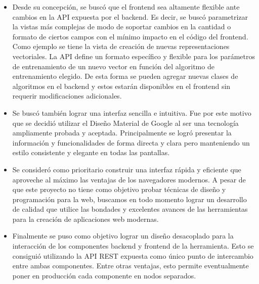 \begin{itemize}

\item Desde su concepción, se buscó que el frontend sea altamente flexible ante cambios en la API expuesta
por el backend. Es decir, se buscó parametrizar la vistas más complejas de modo de soportar cambios en la
cantidad o formato de ciertos campos con el mínimo impacto en el código del frontend. Como ejemplo se tiene
la vista de creación de nuevas representaciones vectoriales. La API define un formato específico y flexible
para los parámetros de entrenamiento de un nuevo vector en función del algoritmo de entrenamiento elegido.
De esta forma se pueden agregar nuevas clases de algoritmos en el backend y estos estarán disponibles en el
frontend sin requerir modificaciones adicionales.

\item Se buscó también lograr una interfaz sencilla e intuitiva. Fue por este motivo que se decidió
utilizar el Diseño Material de Google al ser una tecnología ampliamente probada y aceptada. Principalmente
se logró presentar la información y funcionalidades de forma directa y clara pero manteniendo un estilo
consistente y elegante en todas las pantallas.

\item Se consideró como prioritario construir una interfaz rápida y eficiente que aproveche al máximo las
ventajas de los navegadores modernos. A pesar de que este proyecto no tiene como objetivo probar técnicas
de diseño y programación para la web, buscamos en todo momento lograr un desarrollo de calidad que utilice
las bondades y excelentes avances de las herramientas para la creación de aplicaciones web modernas.

\item Finalmente se puso como objetivo lograr un diseño desacoplado para la interacción de los componentes
backend y frontend de la herramienta. Esto se consiguió utilizando la API REST expuesta como único punto de
intercambio entre ambas componentes. Entre otras ventajas, esto permite eventualmente poner en producción
cada componente en nodos separados.

\end{itemize}
